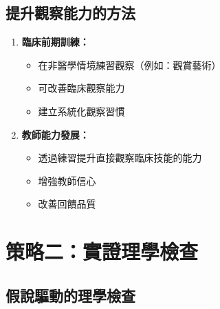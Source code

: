 \documentclass[11pt,a4paper]{article}
\begin{document}
\subsection{提升觀察能力的方法}

\begin{enumerate}
    \item \textbf{臨床前期訓練：}
    \begin{itemize}
        \item 在非醫學情境練習觀察（例如：觀賞藝術）
        \item 可改善臨床觀察能力
        \item 建立系統化觀察習慣
    \end{itemize}
    
    \item \textbf{教師能力發展：}
    \begin{itemize}
        \item 透過練習提升直接觀察臨床技能的能力
        \item 增強教師信心
        \item 改善回饋品質
    \end{itemize}
\end{enumerate}

\section{策略二：實證理學檢查}

\subsection{假說驅動的理學檢查}
\end{document}
